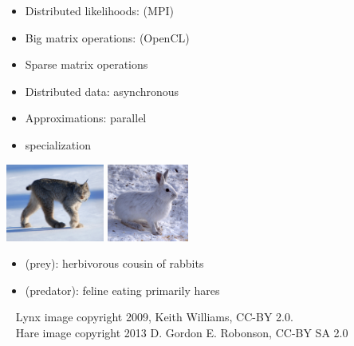 \documentclass[10pt]{report}
\begin{document}
%
\begin{itemize}
\item Distributed likelihoods:  (MPI)
\item Big matrix operations:  (OpenCL)
\item Sparse matrix operations
\item Distributed data: asynchronous 
\item Approximations: parallel 
\item {} specialization
\end{itemize}





%
\begin{center}
\includegraphics[height=1in]{img/lynx.jpg}
\hspace*{0.25in}
\includegraphics[height=1in]{img/hare.jpg}
\end{center}
\begin{itemize}
\item {} (prey): herbivorous cousin of rabbits
\item {} (predator): feline eating primarily hares
\end{itemize}
\vfill
{\tiny
\mbox{ } \hfill
Lynx image copyright 2009, Keith Williams, CC-BY 2.0.
\\[-2pt]
\mbox{ } \hfill
Hare image copyright 2013 D. Gordon E. Robonson, CC-BY SA 2.0}
\end{document}

